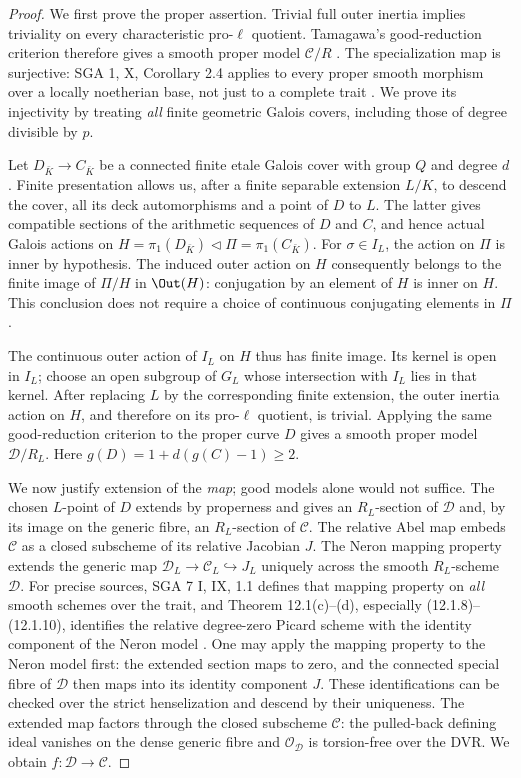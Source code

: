 \begin{proof}
We first prove the proper assertion. Trivial full outer inertia implies
triviality on every characteristic pro-$\ell$ quotient. Tamagawa's
good-reduction criterion therefore gives a smooth proper model
$\mathcal C/R$ \citep[Theorem 5.3]{BC_Tamagawa}. The specialization map
is surjective: SGA 1, X, Corollary 2.4 applies to every proper smooth
morphism over a locally noetherian base, not just to a complete trait
\citep[X, Corollary 2.4]{BC_SGA1}. We prove its injectivity by treating
\emph{all} finite geometric Galois covers, including those of degree
divisible by $p$.

Let $D_{\bar K}\to C_{\bar K}$ be a connected finite etale Galois cover
with group $Q$ and degree $d$. Finite presentation allows us, after a
finite separable extension $L/K$, to descend the cover, all its deck
automorphisms and a point of $D$ to $L$. The latter gives compatible
sections of the arithmetic sequences of $D$ and $C$, and hence actual
Galois actions on $H=\pi_1(D_{\bar K})\triangleleft
\Pi=\pi_1(C_{\bar K})$. For $\sigma\in I_L$, the action on $\Pi$ is
inner by hypothesis. The induced outer action on $H$ consequently belongs
to the finite image of $\Pi/H$ in $\Out(H)$: conjugation by an element
of $H$ is inner on $H$. This conclusion does not require a choice of
continuous conjugating elements in $\Pi$.

The continuous outer action of $I_L$ on $H$ thus has finite image. Its
kernel is open in $I_L$; choose an open subgroup of $G_L$ whose
intersection with $I_L$ lies in that kernel. After replacing $L$ by the
corresponding finite extension, the outer inertia action on $H$, and
therefore on its pro-$\ell$ quotient, is trivial. Applying the same
good-reduction criterion to the proper curve $D$ gives a smooth proper
model $\mathcal D/R_L$. Here $g(D)=1+d(g(C)-1)\ge2$.

We now justify extension of the \emph{map}; good models alone would not
suffice. The chosen $L$-point of $D$ extends by properness and gives an
$R_L$-section of $\mathcal D$ and, by its image on the generic fibre,
an $R_L$-section of $\mathcal C$. The relative Abel map embeds
$\mathcal C$ as a closed subscheme of its relative Jacobian $J$.
The Neron mapping property extends the generic map
$\mathcal D_L\to\mathcal C_L\hookrightarrow J_L$ uniquely across
the smooth $R_L$-scheme $\mathcal D$.
For precise sources, SGA 7 I, IX, 1.1 defines that mapping property on
\emph{all} smooth schemes over the trait, and Theorem 12.1(c)--(d),
especially (12.1.8)--(12.1.10), identifies the relative degree-zero Picard
scheme with the identity component of the Neron model
\citep[IX, 1.1 and Theorem 12.1]{BC_SGA7}. One may apply the mapping
property to the Neron model first: the extended section maps to zero,
and the connected special fibre of $\mathcal D$ then maps into its
identity component $J$. These identifications can be checked over the
strict henselization and descend by their uniqueness.
The extended map factors through the closed subscheme $\mathcal C$:
the pulled-back defining ideal vanishes on the dense generic fibre and
$\mathcal O_{\mathcal D}$ is torsion-free over the DVR. We obtain
$f:\mathcal D\to\mathcal C$.


\end{proof}
